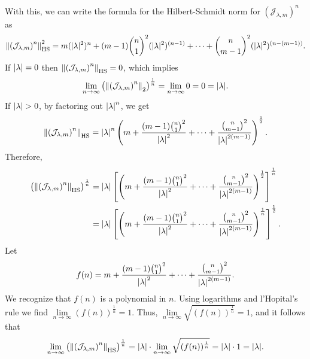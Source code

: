 \documentclass[11pt]{article}
\begin{document}
With this, we can write the formula for the Hilbert-Schmidt norm for $(\mathcal{J}_{\lambda,m})^n$ as
\begin{align*}
\norm{\left(\mathcal{J}_{\lambda,m}\right)^n}_\text{HS}^2 =  m(|\lambda|^{2})^n  + (m-1){n\choose 1}^2(|{\lambda}|^{2})^{(n-1)} + \dots + {n\choose m-1}^2(|{  \lambda}|^{2})^{(n-(m-1))} .
\end{align*}
If $\abs{\lambda} = 0$ then $\norm{\left(\mathcal{J}_{\lambda,m}\right)^n}_\text{HS} = 0$, which implies 
\begin{align*}
\lim\limits_{n\to\infty} \left(\norm{\left(\mathcal{J}_{\lambda,m}\right)^n}_2\right)^{\frac{1}{n}} = \lim\limits_{n\to\infty} 0  = 0= \abs{\lambda}.
\end{align*}
If $\abs{\lambda} > 0$, by factoring out $\abs{\lambda}^n$, we get
\begin{align*}
\norm{\left(\mathcal{J}_{\lambda,m}\right)^n}_\text{HS} = \abs{\lambda}^n \left( m  + \frac{(m-1){n\choose 1}^2}{\abs{\lambda}^2} + \dots + \frac{{n\choose m-1}^2}{\abs{\lambda}^{2(m-1)}}  \right)^\frac{1}{2}.
\end{align*}
Therefore,
\begin{align*}
\left(  \norm{\left(\mathcal{J}_{\lambda,m}\right)^n}_\text{HS} \right)^{\frac{1}{n}} &= \abs{\lambda}\left[\left( m  + \frac{(m-1){n\choose 1}^2}{\abs{\lambda}^2} + \dots + \frac{{n\choose m-1}^2}{\abs{\lambda}^{2(m-1)}}  \right)^\frac{1}{2}\right]^{\frac{1}{n}}\\
&= \abs{\lambda}\left[\left( m + \frac{(m-1){n\choose 1}^2}{\abs{\lambda}^2} + \dots + \frac{{n\choose m-1}^2}{\abs{\lambda}^{2(m-1)}}  \right)^\frac{1}{n}\right]^{\frac{1}{2}}.
\end{align*}
Let
\begin{align*}
f(n) = m  + \frac{(m-1){n\choose 1}^2}{\abs{\lambda}^2} + \dots + \frac{{n\choose m-1}^2}{\abs{\lambda}^{2(m-1)}}.
\end{align*}
We recognize that $f(n)$ is a polynomial in $n$. Using logarithms and l'Hopital's rule we find $\lim\limits_{n\to\infty} (f(n))^{\frac{1}{n}} = 1$. Thus, $\lim\limits_{n\to\infty} \sqrt{(f(n))^{\frac{1}{n}}} = 1$, and it follows that 
\begin{align*}
\lim\limits_{n\to\infty} \left(  \norm{\left(\mathcal{J}_{\lambda,m}\right)^n}_\text{HS} \right)^{\frac{1}{n}} = \abs{\lambda}\cdot\lim\limits_{n\to\infty}\sqrt{(f(n))^{\frac{1}{n}}} = \abs{\lambda}\cdot 1 = \abs{\lambda}.
\end{align*}
\end{document}
